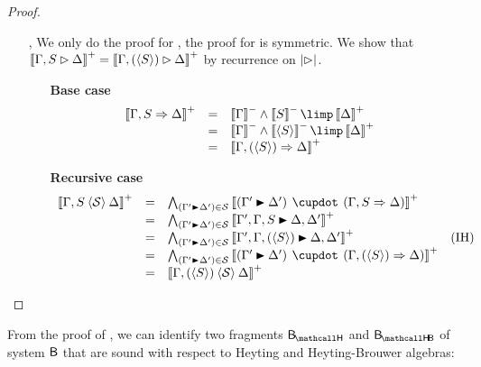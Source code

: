 \begin{proof}
\begin{itemize}
    \item[\rsf{a{-}}, \rsf{a{+}}] We only do the proof for , the proof
    for  is symmetric. We show that $\left\llbracket \Gamma, S \mathbin{\rhd} \Delta \right\rrbracket^+ =
    \left\llbracket \Gamma, (\mathbin{\langle S \rangle}) \mathbin{\rhd} \Delta \right\rrbracket^+$ by recurrence on $\left|\mathbin{\rhd}\right|$.
    \begin{itemize}
      \item[\textbf{Base case}]
        $$
        \begin{array}{rcll}
          \psint{\Gamma, S \seq \Delta}
          &=& \nsint{\Gamma} \land \nsint{S} \limp \psint{\Delta} & \\
          &=& \nsint{\Gamma} \land \nsint{\piq{S}} \limp \psint{\Delta} & \\
          &=& \psint{\Gamma, (\piq{S}) \seq \Delta} & \\
        \end{array}
        $$
      \item[\textbf{Recursive case}]
        $$
        \begin{array}{rcll}
          \psint{\Gamma, S \piq{\cS} \Delta}
          &=& \psintAndMix{(\Gamma' \JB \Delta')}{\cS}{\Gamma, S}{\Delta} & \\
          &=& \psintAnd{(\Gamma' \JB \Delta')}{\cS}{\Gamma', \Gamma, S \JB \Delta, \Delta'} & \\
          &=& \psintAnd{(\Gamma' \JB \Delta')}{\cS}{\Gamma', \Gamma, (\piq{S}) \JB \Delta, \Delta'} &\text{(IH)} \\
          &=& \psintAnd{(\Gamma' \JB \Delta')}{\cS}{(\Gamma' \JB \Delta') \mix (\Gamma, (\piq{S}) \seq \Delta)} & \\
          &=& \psint{\Gamma, (\piq{S}) \piq{\cS} \Delta} & \\
        \end{array}
        $$
    \end{itemize}
    
    \item[\rsf{\top{-}}]
  \end{itemize}
\end{proof}

From the proof of , we can identify two
fragments $\sysBH$ and $\sysBHB$ of system $\mathsf{B}$ that are sound with respect
to Heyting and Heyting-Brouwer algebras:

